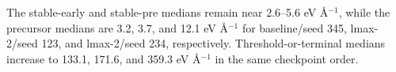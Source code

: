 The stable-early and stable-pre medians remain near 2.6--5.6 eV Å$^{-1}$, while the precursor medians are 3.2, 3.7, and 12.1 eV Å$^{-1}$ for baseline/seed 345, lmax-2/seed 123, and lmax-2/seed 234, respectively. Threshold-or-terminal medians increase to 133.1, 171.6, and 359.3 eV Å$^{-1}$ in the same checkpoint order.
